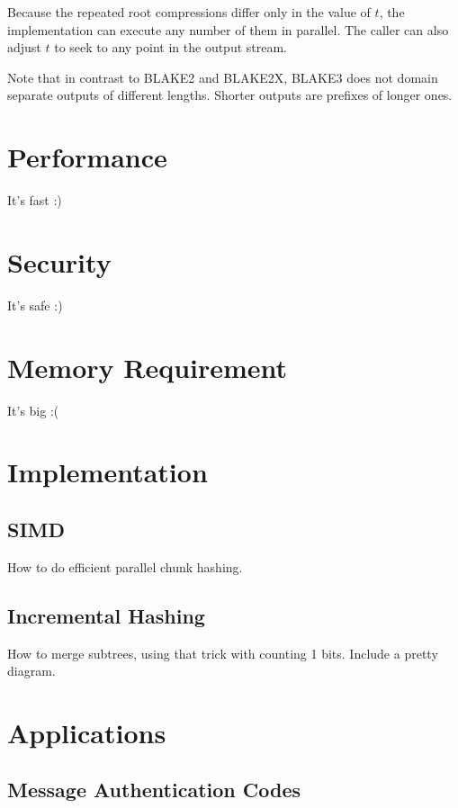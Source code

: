 \documentclass[11pt,notitlepage,a4paper]{article}
\begin{document}
Because the repeated root compressions differ only in the value of $t$, the
implementation can execute any number of them in parallel. The caller can also
adjust $t$ to seek to any point in the output stream.

Note that in contrast to BLAKE2 and BLAKE2X, BLAKE3 does not domain separate
outputs of different lengths. Shorter outputs are prefixes of longer ones.

\section{Performance}\label{sec:performance}

It's fast :)

\section{Security}\label{sec:security}

It's safe :)

\section{Memory Requirement}\label{sec:memory}

It's big :(

\section{Implementation}\label{sec:memory}

\subsection{SIMD}\label{sec:mac}

How to do efficient parallel chunk hashing.

\subsection{Incremental Hashing}\label{sec:mac}

How to merge subtrees, using that trick with counting 1 bits. Include a pretty
diagram.

\section{Applications}\label{sec:memory}

\subsection{Message Authentication Codes}\label{sec:mac}
\end{document}
